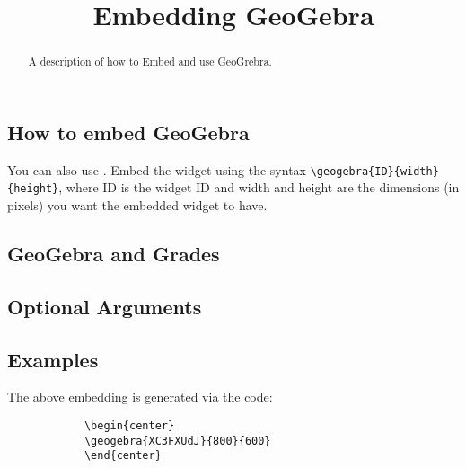 \documentclass{ximera}
\title{Embedding GeoGebra}
\begin{document}
\begin{abstract}
    A description of how to Embed and use GeoGrebra.
\end{abstract}
\maketitle


    \subsection*{How to embed GeoGebra}

        You can also use . Embed the
        widget using the syntax \verb|\geogebra{ID}{width}{height}|, where ID
        is the widget ID and width and height are the dimensions (in pixels)
        you want the embedded widget to have.
        
    \subsection*{GeoGebra and Grades}
        
        

    \subsection*{Optional Arguments}
    
        

    \subsection*{Examples}
    
        \begin{center}
        \end{center}
        
        The above embedding is generated via the code:
        
        \begin{verbatim}
            \begin{center}
            \geogebra{XC3FXUdJ}{800}{600}
            \end{center}
        \end{verbatim}      
    
\end{document}
